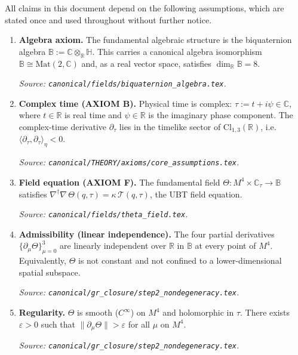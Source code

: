 \documentclass[12pt,a4paper]{article}
\theoremstyle{definition}
\theoremstyle{remark}
\begin{document}
All claims in this document depend on the following assumptions, which are
stated once and used throughout without further notice.

\begin{tcolorbox}[colback=gray!5!white,colframe=gray!50!black,
  title=Explicit Assumption List]
\begin{enumerate}[label=\textbf{A\arabic*.}]

  \item \label{assum:algebra}
        \textbf{Algebra axiom.}
        The fundamental algebraic structure is the biquaternion algebra
        $\mathbb{B} := \mathbb{C}\otimes_{\mathbb{R}}\mathbb{H}$.
        This carries a canonical algebra isomorphism
        $\mathbb{B} \cong \mathrm{Mat}(2,\mathbb{C})$ and, as a real vector
        space, satisfies $\dim_{\mathbb{R}}\mathbb{B} = 8$.
        \par\textit{Source: \texttt{canonical/fields/biquaternion\_algebra.tex}.}

  \item \label{assum:time}
        \textbf{Complex time (AXIOM B).}
        Physical time is complex: $\tau := t + i\psi \in \mathbb{C}$, where
        $t\in\mathbb{R}$ is real time and $\psi\in\mathbb{R}$ is the imaginary
        phase component.  The complex-time derivative $\partial_\tau$ lies in
        the timelike sector of $\mathrm{Cl}_{1,3}(\mathbb{R})$, i.e.\
        $\langle\partial_\tau,\partial_\tau\rangle_\eta < 0$.
        \par\textit{Source: \texttt{canonical/THEORY/axioms/core\_assumptions.tex}.}

  \item \label{assum:field}
        \textbf{Field equation (AXIOM F).}
        The fundamental field $\Theta : M^4\times\mathbb{C}_\tau\to\mathbb{B}$
        satisfies
        $\nabla^\dagger\nabla\,\Theta(q,\tau) = \kappa\,\mathcal{T}(q,\tau)$,
        the UBT field equation.
        \par\textit{Source: \texttt{canonical/fields/theta\_field.tex}.}

  \item \label{assum:indep}
        \textbf{Admissibility (linear independence).}
        The four partial derivatives $\{\partial_\mu\Theta\}_{\mu=0}^3$ are
        linearly independent over $\mathbb{R}$ in $\mathbb{B}$ at every point of
        $M^4$.  Equivalently, $\Theta$ is not constant and not confined to a
        lower-dimensional spatial subspace.
        \par\textit{Source: \texttt{canonical/gr\_closure/step2\_nondegeneracy.tex}.}

  \item \label{assum:smooth}
        \textbf{Regularity.}
        $\Theta$ is smooth ($C^\infty$) on $M^4$ and holomorphic in $\tau$.
        There exists $\varepsilon>0$ such that
        $\|\partial_\mu\Theta\| > \varepsilon$ for all $\mu$ on $M^4$.
        \par\textit{Source: \texttt{canonical/gr\_closure/step2\_nondegeneracy.tex}.}

\end{enumerate}
\end{tcolorbox}
\end{document}
